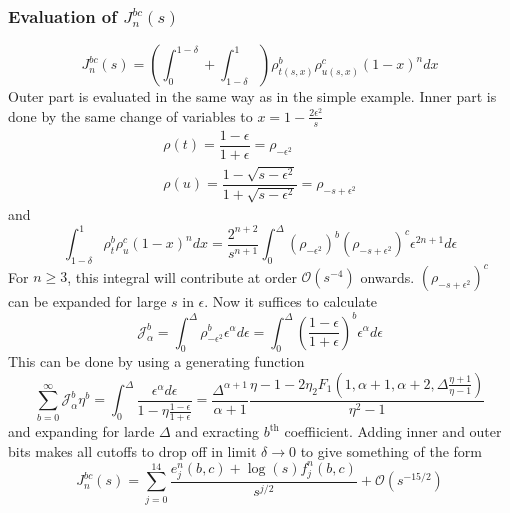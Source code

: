 ﻿\documentclass[12pt,a4paper]{article}
\begin{document}
\subsubsection{Evaluation of $J_{n}^{b c}(s)$}
$$
J_{n}^{b c}(s)=\left(\int_{0}^{1-\delta}+\int_{1-\delta}^{1}\right) \rho_{t(s, x)}^{b} \rho_{u(s, x)}^{c}(1-x)^{n} d x
$$
Outer part is evaluated in the same way as in the simple example. Inner part is done by the same change of variables to $x=1-\frac{2 \epsilon^{2}}{s}$
$$
\begin{array}{l}
\rho(t)=\dfrac{1-\epsilon}{1+\epsilon}=\rho_{-\epsilon^{2}}\\
\rho(u)=\dfrac{1-\sqrt{s-\epsilon^{2}}}{1+\sqrt{s-\epsilon^{2}}}=\rho_{-s+\epsilon^{2}}
\end{array}
$$
and
$$
\int_{1-\delta}^{1} \rho_{t}^{b} \rho_{u}^{c}(1-x)^{n} d x=\frac{2^{n+2}}{s^{n+1}} \int_{0}^{\Delta}\left(\rho_{-\epsilon^{2}}\right)^{b}\left(\rho_{-s+\epsilon^{2}}\right)^{c} \epsilon^{2 n+1} d \epsilon
$$
For $n \geq 3$, this integral will contribute at order $\mathcal{O}\left(s^{-4}\right)$ onwards. $\left(\rho_{-s+\epsilon^{2}}\right)^{c}$ can be expanded for large $s$ in $\epsilon$. Now it suffices to calculate 
$$
\mathcal{J}_{\alpha}^{b}=\int_{0}^{\Delta} \rho_{-\epsilon^{2}}^{b} \epsilon^{\alpha} d \epsilon=\int_{0}^{\Delta}\left(\frac{1-\epsilon}{1+\epsilon}\right)^{b} \epsilon^{\alpha} d \epsilon
$$
This can be done by using a generating function
$$
\sum_{b=0}^{\infty} \mathcal{J}_{\alpha}^{b} \eta^{b} =\int_{0}^{\Delta} \frac{\epsilon^{\alpha} d \epsilon}{1-\eta \frac{1-\epsilon}{1+\epsilon}}
=\frac{\Delta^{\alpha+1}}{\alpha+1} \frac{\eta-1-2 \eta_{2} F_{1}\left(1, \alpha+1, \alpha+2, \Delta \frac{\eta+1}{\eta-1}\right)}{\eta^{2}-1} 
$$
and expanding for larde $\Delta$ and exracting $b^{\text{th}}$ coeffiicient. Adding inner and outer bits makes all cutoffs to drop off in limit $\delta \rightarrow 0$ to give something of the form
$$
J_{n}^{b c}(s)=\sum_{j=0}^{14} \frac{e_{j}^{n}(b, c)+\log (s) f_{j}^{n}(b, c)}{s^{j / 2}}+\mathcal{O}\left(s^{-15 / 2}\right)
$$
\end{document}
